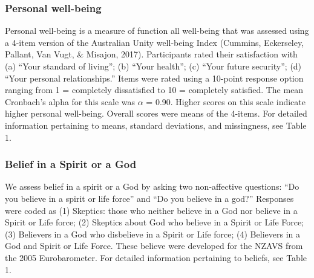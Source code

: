\documentclass[
  english,
  man]{apa6}
\begin{document}
\hypertarget{personal-well-being}{%
\subsubsection{Personal well-being}\label{personal-well-being}}

Personal well-being is a measure of function all well-being that was assessed using a 4-item version of the Australian Unity well-being Index (Cummins, Eckerseley, Pallant, Van Vugt, \& Misajon, 2017). Participants rated their satisfaction with (a) \enquote{Your standard of living}; (b) \enquote{Your health}; (c) \enquote{Your future security}; (d) \enquote{Your personal relationships.} Items were rated using a 10-point response option ranging from 1 = completely dissatisfied to 10 = completely satisfied. The mean Cronbach's alpha for this scale was \(\alpha\) = 0.90. Higher scores on this scale indicate higher personal well-being. Overall scores were means of the 4-items. For detailed information pertaining to means, standard deviations, and missingness, see Table 1.

\hypertarget{belief-in-a-spirit-or-a-god}{%
\subsubsection{Belief in a Spirit or a God}\label{belief-in-a-spirit-or-a-god}}

We assess belief in a spirit or a God by asking two non-affective questions: \enquote{Do you believe in a spirit or life force} and \enquote{Do you believe in a god?} Responses were coded as (1) Skeptics: those who neither believe in a God nor believe in a Spirit or Life force; (2) Skeptics about God who believe in a Spirit or Life Force; (3) Believers in a God who disbelieve in a Spirit or Life force; (4) Believers in a God and Spirit or Life Force. These believe were developed for the NZAVS from the 2005 Eurobarometer. For detailed information pertaining to beliefs, see Table 1.
\end{document}

